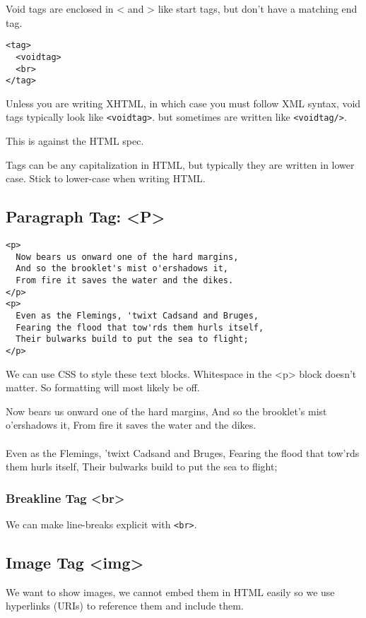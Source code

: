 \documentclass[../CMPUT-404-Notes.tex]{subfiles}
\begin{document}
Void tags are enclosed in < and > like start tags, but don't have a matching end tag.
\begin{verbatim}
<tag>
  <voidtag>
  <br>
</tag>
\end{verbatim}

Unless you are writing XHTML, in which case you must follow XML syntax, void tags typically look like \texttt{<voidtag>}. but sometimes are written like \texttt{<voidtag/>}.

This is against the HTML spec.

Tags can be any capitalization in HTML, but typically they are written in lower case. Stick to lower-case when writing HTML.

\subsection{Paragraph Tag: <P>}

\begin{verbatim}
<p>
  Now bears us onward one of the hard margins,
  And so the brooklet's mist o'ershadows it,
  From fire it saves the water and the dikes.
</p>
<p>
  Even as the Flemings, 'twixt Cadsand and Bruges,
  Fearing the flood that tow'rds them hurls itself,
  Their bulwarks build to put the sea to flight;
</p>
\end{verbatim}
We can use CSS to style these text blocks. Whitespace in the <p> block doesn't matter. So formatting will most likely be off.

\begin{quotebox}
  Now bears us onward one of the hard margins, And so the brooklet's mist o'ershadows it, From fire it saves the water and the dikes. 
  \\~\\
  \noindent Even as the Flemings, 'twixt Cadsand and Bruges, Fearing the flood that tow'rds them hurls itself, Their bulwarks build to put the sea to flight;
\end{quotebox}

\subsubsection{Breakline Tag <br>}
We can make line-breaks explicit with \texttt{<br>}.

\subsection{Image Tag <img>}
We want to show images, we cannot embed them in HTML easily so we use hyperlinks (URIs) to reference them and include them.
\end{document}
